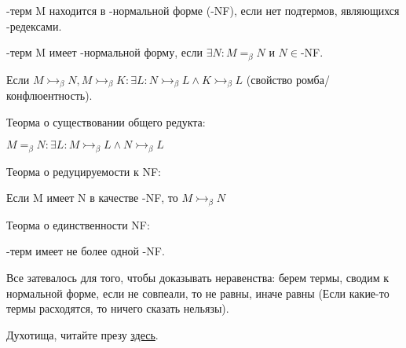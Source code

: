 \begin{definition}
    \lambda-терм M находится в \beta-нормальной форме (\beta-NF), если нет подтермов, являющихся \beta-редексами.
\end{definition}

\begin{definition}
    \lambda-терм M имеет \beta-нормальной форму, если $\exists N: M=_{\beta} N$ и $N \in $\beta-NF.
\end{definition}

\begin{theorem}
    Если $M \rightarrowtail_{\beta} N, M \rightarrowtail_{\beta} K: \exists L: N \rightarrowtail_{\beta} L \land K \rightarrowtail_{\beta} L$ (свойство ромба/конфлюентность).
\end{theorem}

\begin{consequence}
    Теорма о существовании общего редукта:

    $M =_{\beta} N: \exists L: M \rightarrowtail_{\beta} L \land N \rightarrowtail_{\beta} L$
\end{consequence}

\begin{consequence}
    Теорма о редуцируемости к NF:

    Если M имеет N в качестве \beta-NF, то $M \rightarrowtail_{\beta} N$
\end{consequence}

\begin{consequence}
    Теорма о единственности NF:

    \lambda-терм имеет не более одной \beta-NF.
\end{consequence}

\begin{statement}
    Все затевалось для того, чтобы доказывать неравенства: берем термы, сводим к нормальной форме, если не совпеали, то не равны, иначе равны (Если какие-то термы расходятся, то ничего сказать нельязы).     
\end{statement}

Духотища, читайте презу \href{https://wiki.compscicenter.ru/images/7/7a/Fpc02HSE2022.pdf}{здесь}.